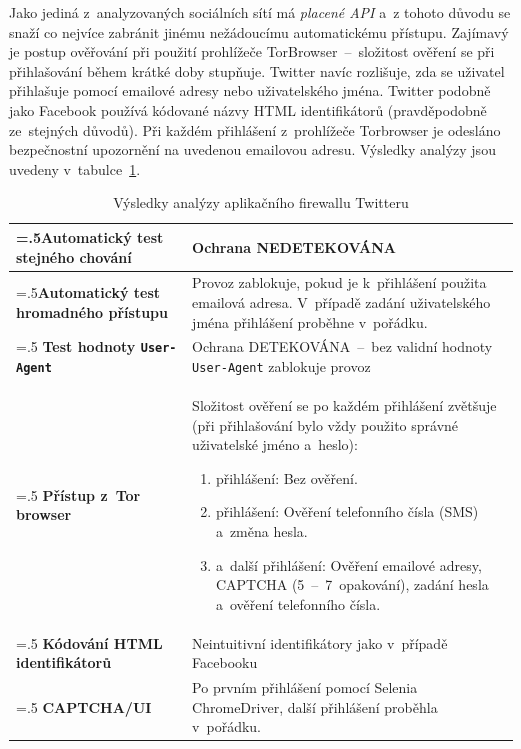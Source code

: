 Jako jediná z~analyzovaných sociálních sítí má \textit{placené API} a~z tohoto důvodu se snaží co nejvíce zabránit jinému nežádoucímu automatickému přístupu. Zajímavý je postup ověřování při použití prohlížeče TorBrowser~--~složitost ověření se při přihlašování během krátké doby stupňuje. Twitter navíc rozlišuje, zda se uživatel přihlašuje pomocí emailové adresy nebo uživatelského jména. Twitter podobně jako Facebook používá kódované názvy HTML identifikátorů (pravděpodobně ze~stejných důvodů). Při každém přihlášení z~prohlížeče Torbrowser je odesláno bezpečnostní upozornění na uvedenou emailovou adresu. Výsledky analýzy jsou uvedeny v~tabulce~\ref{tab:Twitter_analyse}.

\begin{table}[H]
\begin{tabularx}{\linewidth}{
  |>{\raggedright\arraybackslash\hsize=.5\hsize}X|>{\hsize=1.5\hsize}X|
  }

\hline
\textbf{Automatický test stejného chování} & Ochrana NEDETEKOVÁNA \\
\hline
\textbf{Automatický test hromadného přístupu} & Provoz zablokuje, pokud je k~přihlášení použita emailová adresa. V~případě zadání uživatelského jména přihlášení proběhne v~pořádku. \\
\hline
\textbf{Test hodnoty \texttt{User-Agent}} & Ochrana DETEKOVÁNA~--~bez validní hodnoty \texttt{User-Agent} zablokuje provoz \\
\hline
\textbf{Přístup z~Tor browser} & Složitost ověření se po každém přihlášení zvětšuje (při přihlašování bylo vždy použito správné uživatelské jméno a~heslo):
\begin{enumerate}
  \item přihlášení: Bez ověření.
  \item přihlášení: Ověření telefonního čísla (SMS) a~změna hesla.
  \item a~další přihlášení: Ověření emailové adresy, CAPTCHA (5~--~7~opakování), zadání hesla a~ověření telefonního čísla.
\end{enumerate}
\\ \hline
\textbf{Kódování HTML identifikátorů} & Neintuitivní identifikátory jako v~případě Facebooku\\
\hline
\textbf{CAPTCHA/UI} & Po prvním přihlášení pomocí Selenia ChromeDriver, další přihlášení proběhla v~pořádku. \\
\hline
\end{tabularx}
\label{tab:Twitter_analyse}
\caption{Výsledky analýzy aplikačního firewallu Twitteru}
\end{table}

